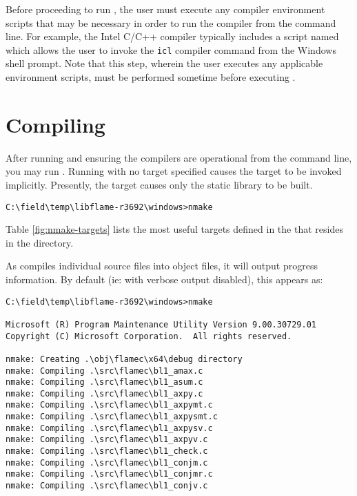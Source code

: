 Before proceeding to run \nmakens, the user must execute any compiler
environment scripts that may be necessary in order to run the compiler from
the command line.
For example, the Intel C/C++ compiler typically includes a script named which
allows the user to invoke the {\tt icl} compiler command from the Windows
shell prompt.
Note that this step, wherein the user executes any applicable environment
scripts, must be performed sometime before executing \nmakens.




\section{Compiling}


After running \configurecmd and ensuring the compilers are operational from
the command line, you may run \nmake.
Running \nmake with no target specified causes the \all target to be
invoked implicitly.
Presently, the \all target causes only the static library to be built.

\begin{Verbatim}[frame=single,framesep=2.5mm,xleftmargin=5mm,fontsize=\footnotesize]
C:\field\temp\libflame-r3692\windows>nmake
\end{Verbatim}

\noindent
Table \ref{fig:nmake-targets} lists the most useful \nmake targets defined
in the \makefile that resides in the \windows directory.

As \nmake compiles individual source files into object files, it will output
progress information.
By default (ie: with verbose output disabled), this appears as:

\begin{Verbatim}[frame=single,framesep=2.5mm,xleftmargin=5mm,fontsize=\footnotesize]
C:\field\temp\libflame-r3692\windows>nmake

Microsoft (R) Program Maintenance Utility Version 9.00.30729.01
Copyright (C) Microsoft Corporation.  All rights reserved.

nmake: Creating .\obj\flamec\x64\debug directory
nmake: Compiling .\src\flamec\bl1_amax.c
nmake: Compiling .\src\flamec\bl1_asum.c
nmake: Compiling .\src\flamec\bl1_axpy.c
nmake: Compiling .\src\flamec\bl1_axpymt.c
nmake: Compiling .\src\flamec\bl1_axpysmt.c
nmake: Compiling .\src\flamec\bl1_axpysv.c
nmake: Compiling .\src\flamec\bl1_axpyv.c
nmake: Compiling .\src\flamec\bl1_check.c
nmake: Compiling .\src\flamec\bl1_conjm.c
nmake: Compiling .\src\flamec\bl1_conjmr.c
nmake: Compiling .\src\flamec\bl1_conjv.c
\end{Verbatim}

